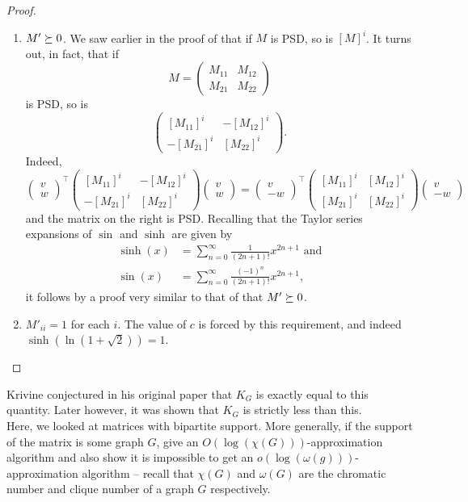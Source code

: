 \begin{proof}
\begin{enumerate}[label=(\alph*)]
			\item $M' \succeq 0$. We saw earlier in the proof of  that if $M$ is PSD, so is $[M]^i$. It turns out, in fact, that if
			\[ M = \begin{pmatrix} M_{11} & M_{12} \\ M_{21} & M_{22} \end{pmatrix} \]
			is PSD, so is
			\[ \begin{pmatrix} [M_{11}]^i & -[M_{12}]^i \\ -[M_{21}]^i & [M_{22}]^i \end{pmatrix}. \]
			Indeed,
			\[ \begin{pmatrix} v \\ w \end{pmatrix}^\top \begin{pmatrix} [M_{11}]^i & -[M_{12}]^i \\ -[M_{21}]^i & [M_{22}]^i \end{pmatrix} \begin{pmatrix} v \\ w \end{pmatrix} = \begin{pmatrix} v \\ -w \end{pmatrix}^\top \begin{pmatrix} [M_{11}]^i & [M_{12}]^i \\ [M_{21}]^i & [M_{22}]^i \end{pmatrix} \begin{pmatrix} v \\ -w \end{pmatrix} \]
			and the matrix on the right is PSD.
			Recalling that the Taylor series expansions of $\sin$ and $\sinh$ are given by
			\begin{align*}
				\sinh(x) &= \sum_{n=0}^{\infty} \frac{1}{(2n+1)!} x^{2n+1} \text{ and} \\
				\sin(x) &= \sum_{n=0}^{\infty} \frac{(-1)^n}{(2n+1)!} x^{2n+1},
			\end{align*}
			it follows by a proof very similar to that of  that $M' \succeq 0$.
			\item $M'_{ii} = 1$ for each $i$. The value of $c$ is forced by this requirement, and indeed $\sinh(\ln(1+\sqrt{2})) = 1$. \qedhere
		\end{enumerate}
	\end{proof}

	Krivine conjectured in his original paper that $K_G$ is exactly equal to this quantity. Later however, it was shown \cite{braverman-krivine} that $K_G$ is strictly less than this.\\

	Here, we looked at matrices with bipartite support. More generally, if the support of the matrix is some graph $G$, \cite{generalized-grothendieck-graph-supp} give an $O(\log(\chi(G)))$-approximation algorithm and also show it is impossible to get an $o(\log(\omega(g)))$-approximation algorithm -- recall that $\chi(G)$ and $\omega(G)$ are the chromatic number and clique number of a graph $G$ respectively.